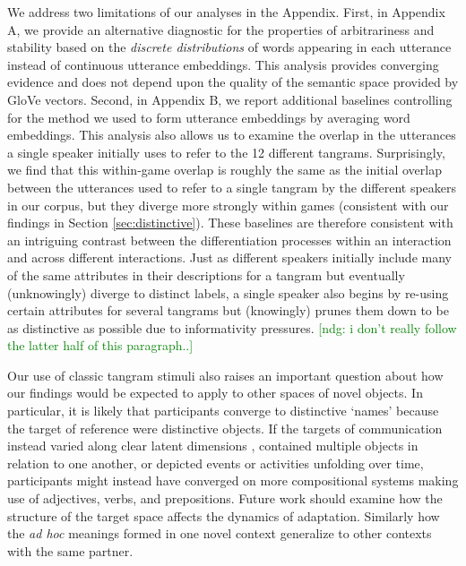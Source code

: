 \documentclass[alpha-refs]{wiley-article}
\newcommand{\ndg}[1]{\textcolor{green}{[ndg: #1]}}
\begin{document}
We address two limitations of our analyses in the Appendix.
First, in Appendix A, we provide an alternative diagnostic for the properties of arbitrariness and stability based on the \emph{discrete distributions} of words appearing in each utterance instead of continuous utterance embeddings.
This analysis provides converging evidence and does not depend upon the quality of the semantic space provided by GloVe vectors.
Second, in Appendix B, we report additional baselines controlling for the method we used to form utterance embeddings by averaging word embeddings.
This analysis also allows us to examine the overlap in the utterances a single speaker initially uses to refer to the 12 different tangrams.
Surprisingly, we find that this within-game overlap is roughly the same as the initial overlap between the utterances used to refer to a single tangram by the different speakers in our corpus, but they diverge more strongly within games (consistent with our findings in Section \ref{sec:distinctive}).
These baselines are therefore consistent with an intriguing contrast between the differentiation processes within an interaction and across different interactions.
Just as different speakers initially include many of the same attributes in their descriptions for a tangram but eventually (unknowingly) diverge to distinct labels, a single speaker also begins by re-using certain attributes for several tangrams but (knowingly) prunes them down to be as distinctive as possible due to informativity pressures.
\ndg{i don't really follow the latter half of this paragraph..}


Our use of classic tangram stimuli also raises an important question about how our findings would be expected to apply to other spaces of novel objects. 
In particular, it is likely that participants converge to distinctive `names' because the target of reference were distinctive objects.
If the targets of communication instead varied along clear latent dimensions \citep[e.g.][]{nolle2018emergence}, contained multiple objects in relation to one another, or depicted events or activities unfolding over time, participants might instead have converged on more compositional systems making use of adjectives, verbs, and prepositions.
Future work should examine how the structure of the target space affects the dynamics of adaptation. Similarly how the \emph{ad hoc} meanings formed in one novel context generalize to other contexts with the same partner.
\end{document}
